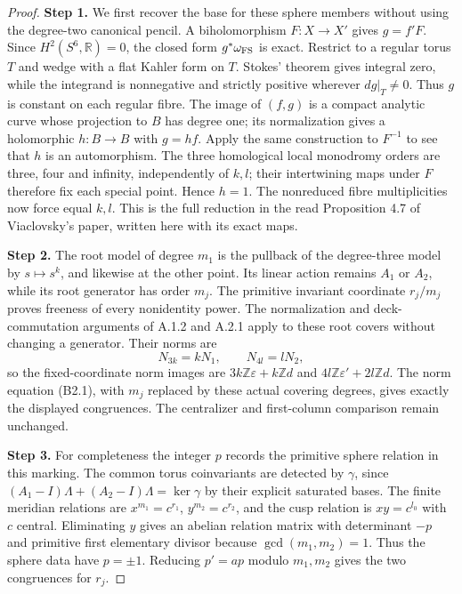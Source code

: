 \documentclass[11pt,a4paper]{article}
\theoremstyle{plain}
\theoremstyle{definition}
\begin{document}
\begin{proof}
\par\smallskip\noindent\textbf{Step 1.} We first recover the base for these sphere members without using the degree-two canonical pencil. A biholomorphism $F:X\to X'$ gives $g=f'F$. Since $H^2(S^6,\mathbb R)=0$, the closed form $g^*\omega_{\rm FS}$ is exact. Restrict to a regular torus $T$ and wedge with a flat Kahler form on $T$. Stokes' theorem gives integral zero, while the integrand is nonnegative and strictly positive wherever $dg|_T\ne0$. Thus $g$ is constant on each regular fibre. The image of $(f,g)$ is a compact analytic curve whose projection to $B$ has degree one; its normalization gives a holomorphic $h:B\to B$ with $g=hf$. Apply the same construction to $F^{-1}$ to see that $h$ is an automorphism. The three homological local monodromy orders are three, four and infinity, independently of $k,l$; their intertwining maps under $F$ therefore fix each special point. Hence $h=1$. The nonreduced fibre multiplicities now force equal $k,l$. This is the full reduction in the read Proposition 4.7 of Viaclovsky's paper, written here with its exact maps.

\par\smallskip\noindent\textbf{Step 2.} The root model of degree $m_1$ is the pullback of the degree-three model by $s\mapsto s^k$, and likewise at the other point. Its linear action remains $A_1$ or $A_2$, while its root generator has order $m_j$. The primitive invariant coordinate $r_j/m_j$ proves freeness of every nonidentity power. The normalization and deck-commutation arguments of A.1.2 and A.2.1 apply to these root covers without changing a generator. Their norms are
\[
 N_{3k}=kN_1,\qquad N_{4l}=lN_2,
\]
so the fixed-coordinate norm images are $3k\mathbb Z\varepsilon+k\mathbb Zd$ and $4l\mathbb Z\varepsilon'+2l\mathbb Zd$. The norm equation (B2.1), with $m_j$ replaced by these actual covering degrees, gives exactly the displayed congruences. The centralizer and first-column comparison remain unchanged.

\par\smallskip\noindent\textbf{Step 3.} For completeness the integer $p$ records the primitive sphere relation in this marking. The common torus coinvariants are detected by $\gamma$, since $(A_1-I)\Lambda+(A_2-I)\Lambda=\ker\gamma$ by their explicit saturated bases. The finite meridian relations are $x^{m_1}=c^{r_1}$, $y^{m_2}=c^{r_2}$, and the cusp relation is $xy=c^{l_0}$ with $c$ central. Eliminating $y$ gives an abelian relation matrix with determinant $-p$ and primitive first elementary divisor because $\gcd(m_1,m_2)=1$. Thus the sphere data have $p=\pm1$. Reducing $p'=ap$ modulo $m_1,m_2$ gives the two congruences for $r_j$.


\end{proof}
\end{document}
